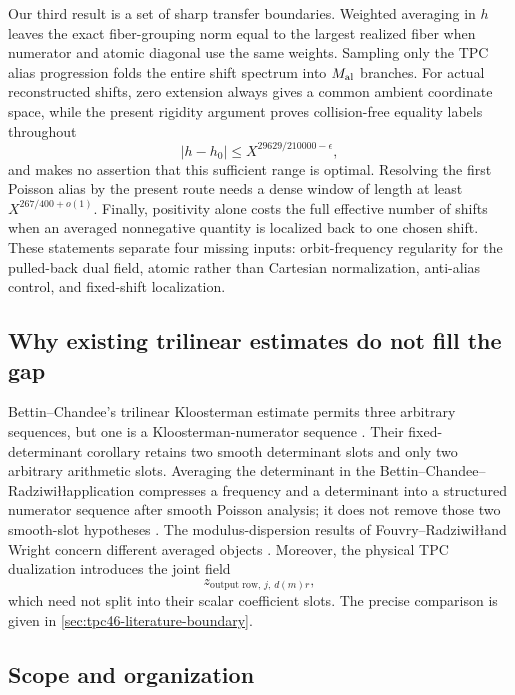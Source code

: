 Our third result is a set of sharp transfer boundaries.  Weighted
averaging in \(h\) leaves the exact fiber-grouping norm equal to the
largest realized fiber when numerator and atomic diagonal use the same
weights.  Sampling only the TPC alias progression folds the entire
shift spectrum into \(M_{\rm al}\) branches.  For actual reconstructed
shifts, zero extension always gives a common ambient coordinate space,
while the present rigidity argument proves collision-free equality
labels throughout
\begin{equation}
 |h-h_0|\le
 X^{29629/210000-\epsilon},
 \label{eq:tpc46-intro-local-range}
\end{equation}
and makes no assertion that this sufficient range is optimal.  Resolving
the first Poisson alias by the present route needs a dense window of
length at least \(X^{267/400+o(1)}\).  Finally, positivity alone costs
the full effective number of shifts when an averaged nonnegative
quantity is localized back to one chosen shift.  These statements
separate four missing inputs: orbit-frequency regularity for the
pulled-back dual field, atomic rather than Cartesian normalization,
anti-alias control, and fixed-shift localization.

\subsection{Why existing trilinear estimates do not fill the gap}

Bettin--Chandee's trilinear Kloosterman estimate permits three arbitrary
sequences, but one is a Kloosterman-numerator sequence
\citep{BC2018}.  Their fixed-determinant corollary retains two smooth
determinant slots and only two arbitrary arithmetic slots.  Averaging
the determinant in the Bettin--Chandee--Radziwi\l\l application
compresses a frequency and a determinant into a structured numerator
sequence after smooth Poisson analysis; it does not remove those two
smooth-slot hypotheses \citep{BCR2017}.  The modulus-dispersion results
of Fouvry--Radziwi\l\l and Wright concern different averaged objects
\citep{FR2022,Wright2026}.  Moreover, the physical TPC dualization
introduces the joint field
\[
 z_{\text{output row},\,j,\,d(m)r},
\]
which need not split into their scalar coefficient slots.  The precise
comparison is given in \cref{sec:tpc46-literature-boundary}.

\subsection{Scope and organization}

